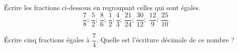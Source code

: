 
\begin{exercice}\label{exosmath-0798}



Écrire les fractions ci-dessous en regroupant celles qui sont égales.
\begin{equation}
    \dfrac{ 7 }{ 8 };\,\dfrac{ 5 }{ 2 };\,\dfrac{ 8 }{ 6 };\,\dfrac{ 1 }{ 2 }:\dfrac{ 4 }{ 3 };\,\dfrac{ 21 }{ 24 };\,\dfrac{ 30 }{ 12 };\;\dfrac{ 12 }{ 9 };\,\dfrac{ 25 }{ 10 }.
\end{equation}

Écrire cinq fractions égales à \( \dfrac{ 7 }{ 4 }\). Quelle est l'écriture décimale de ce nombre ?

\end{exercice}
